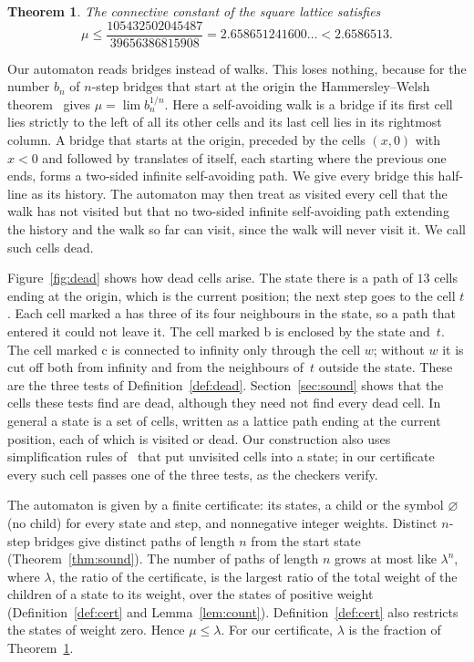 \documentclass[11pt]{amsart}
\newtheorem{theorem}{Theorem}[section]
\theoremstyle{definition}
\theoremstyle{remark}
\numberwithin{equation}{section}
\newcommand{\LamRedNum}{105432502045487}
\newcommand{\LamRedDen}{39656386815908}
\newcommand{\LamDec}{2.658651241600}
\newcommand{\MuUB}{2.6586513}
\begin{document}
\begin{theorem}\label{thm:main}
The connective constant of the square lattice satisfies
\[
\mu\le\frac{\LamRedNum}{\LamRedDen}=\LamDec\ldots<\MuUB.
\]
\end{theorem}

Our automaton reads bridges instead of walks. This loses nothing, because for the number $b_n$ of $n$-step bridges that start at the origin the Hammersley--Welsh theorem~\cite{HW62} gives $\mu=\lim b_n^{1/n}$. Here a self-avoiding walk is a bridge if its first cell lies strictly to the left of all its other cells and its last cell lies in its rightmost column. A bridge that starts at the origin, preceded by the cells $(x,0)$ with $x<0$ and followed by translates of itself, each starting where the previous one ends, forms a two-sided infinite self-avoiding path. We give every bridge this half-line as its history. The automaton may then treat as visited every cell that the walk has not visited but that no two-sided infinite self-avoiding path extending the history and the walk so far can visit, since the walk will never visit it. We call such cells dead.

Figure~\ref{fig:dead} shows how dead cells arise. The state there is a path of $13$ cells ending at the origin, which is the current position; the next step goes to the cell $t$. Each cell marked a has three of its four neighbours in the state, so a path that entered it could not leave it. The cell marked b is enclosed by the state and~$t$. The cell marked c is connected to infinity only through the cell $w$; without $w$ it is cut off both from infinity and from the neighbours of~$t$ outside the state. These are the three tests of Definition~\ref{def:dead}. Section~\ref{sec:sound} shows that the cells these tests find are dead, although they need not find every dead cell. In general a state is a set of cells, written as a lattice path ending at the current position, each of which is visited or dead. Our construction also uses simplification rules of~\cite{Cou25} that put unvisited cells into a state; in our certificate every such cell passes one of the three tests, as the checkers verify.

The automaton is given by a finite certificate: its states, a child or the symbol $\varnothing$ (no child) for every state and step, and nonnegative integer weights. Distinct $n$-step bridges give distinct paths of length $n$ from the start state (Theorem~\ref{thm:sound}). The number of paths of length $n$ grows at most like $\lambda^n$, where $\lambda$, the ratio of the certificate, is the largest ratio of the total weight of the children of a state to its weight, over the states of positive weight (Definition~\ref{def:cert} and Lemma~\ref{lem:count}). Definition~\ref{def:cert} also restricts the states of weight zero. Hence $\mu\le\lambda$. For our certificate, $\lambda$ is the fraction of Theorem~\ref{thm:main}.
\end{document}
